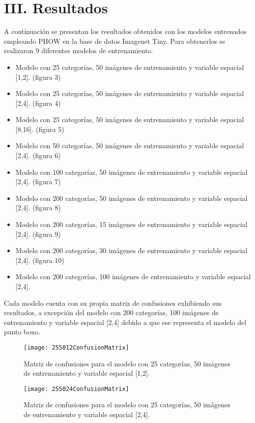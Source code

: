 \documentclass[10pt,twocolumn,letterpaper]{article}
\begin{document}
\section{\textbf{ III. Resultados}}
A continuación se presentan los resultados obtenidos con los modelos entrenados empleando PHOW en la base de datos Imagenet Tiny. Para obtenerlos se realizaron 9 diferentes modelos de entrenamiento. 
\begin{itemize}
  \item Modelo con 25 categorías, 50 imágenes de entrenamiento y variable espacial [1,2]. (figura 3)
  \item Modelo con 25 categorías, 50 imágenes de entrenamiento y variable espacial [2,4]. (figura 4)
  \item Modelo con 25 categorías, 50 imágenes de entrenamiento y variable espacial [8,16]. (figura 5)
  \item Modelo con 50 categorías, 50 imágenes de entrenamiento y variable espacial [2,4]. (figura 6)
  \item Modelo con 100 categorías, 50 imágenes de entrenamiento y variable espacial [2,4]. (figura 7)
  \item Modelo con 200 categorías, 50 imágenes de entrenamiento y variable espacial [2,4]. (figura 8)
  \item Modelo con 200 categorías, 15 imágenes de entrenamiento y variable espacial [2,4]. (figura 9)
  \item Modelo con 200 categorías, 30 imágenes de entrenamiento y variable espacial [2,4]. (figura 10)
  \item Modelo con 200 categorías, 100 imágenes de entrenamiento y variable espacial [2,4].
\end{itemize}

Cada modelo cuenta con su propia matriz de confusiones exhibiendo sus resultados, a excepción del modelo con 200 categorías, 100 imágenes de entrenamiento y variable espacial [2,4] debido a que ese representa el modelo del punto bono. 

\begin{figure}
\begin{center}
   \texttt{[image: 255012ConfusionMatrix]}
\end{center}
   \caption{Matriz de confusiones para el modelo con 25 categorías, 50 imágenes de entrenamiento y variable espacial [1,2].}
\end{figure}

\begin{figure}
\begin{center}
   \texttt{[image: 255024ConfusionMatrix]} 
\end{center}
   \caption{Matriz de confusiones para el modelo con 25 categorías, 50 imágenes de entrenamiento y variable espacial [2,4].}
\end{figure}
\end{document}
